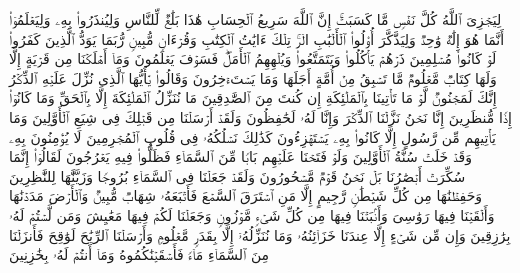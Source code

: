 \startbuffer[\q:14:51]
لِیَجۡزِیَ ٱللَّهُ كُلَّ نَفۡسࣲ مَّا كَسَبَتۡۚ إِنَّ ٱللَّهَ سَرِیعُ ٱلۡحِسَابِ%
\stopbuffer%
\startbuffer[\q:14:52]
هَٰذَا بَلَٰغࣱ لِّلنَّاسِ وَلِیُنذَرُوا۟ بِهِۦ وَلِیَعۡلَمُوۤا۟ أَنَّمَا هُوَ إِلَٰهࣱ وَٰحِدࣱ وَلِیَذَّكَّرَ أُو۟لُوا۟ ٱلۡأَلۡبَٰبِ%
\stopbuffer%
\startbuffer[\q:15:1]
الۤرۚ تِلۡكَ ءَایَٰتُ ٱلۡكِتَٰبِ وَقُرۡءَانࣲ مُّبِینࣲ%
\stopbuffer%
\startbuffer[\q:15:2]
رُّبَمَا یَوَدُّ ٱلَّذِینَ كَفَرُوا۟ لَوۡ كَانُوا۟ مُسۡلِمِینَ%
\stopbuffer%
\startbuffer[\q:15:3]
ذَرۡهُمۡ یَأۡكُلُوا۟ وَیَتَمَتَّعُوا۟ وَیُلۡهِهِمُ ٱلۡأَمَلُۖ فَسَوۡفَ یَعۡلَمُونَ%
\stopbuffer%
\startbuffer[\q:15:4]
وَمَاۤ أَهۡلَكۡنَا مِن قَرۡیَةٍ إِلَّا وَلَهَا كِتَابࣱ مَّعۡلُومࣱ%
\stopbuffer%
\startbuffer[\q:15:5]
مَّا تَسۡبِقُ مِنۡ أُمَّةٍ أَجَلَهَا وَمَا یَسۡتَءۡخِرُونَ%
\stopbuffer%
\startbuffer[\q:15:6]
وَقَالُوا۟ یَٰۤأَیُّهَا ٱلَّذِی نُزِّلَ عَلَیۡهِ ٱلذِّكۡرُ إِنَّكَ لَمَجۡنُونࣱ%
\stopbuffer%
\startbuffer[\q:15:7]
لَّوۡ مَا تَأۡتِینَا بِٱلۡمَلَٰۤئِكَةِ إِن كُنتَ مِنَ ٱلصَّٰدِقِینَ%
\stopbuffer%
\startbuffer[\q:15:8]
مَا نُنَزِّلُ ٱلۡمَلَٰۤئِكَةَ إِلَّا بِٱلۡحَقِّ وَمَا كَانُوۤا۟ إِذࣰا مُّنظَرِینَ%
\stopbuffer%
\startbuffer[\q:15:9]
إِنَّا نَحۡنُ نَزَّلۡنَا ٱلذِّكۡرَ وَإِنَّا لَهُۥ لَحَٰفِظُونَ%
\stopbuffer%
\startbuffer[\q:15:10]
وَلَقَدۡ أَرۡسَلۡنَا مِن قَبۡلِكَ فِی شِیَعِ ٱلۡأَوَّلِینَ%
\stopbuffer%
\startbuffer[\q:15:11]
وَمَا یَأۡتِیهِم مِّن رَّسُولٍ إِلَّا كَانُوا۟ بِهِۦ یَسۡتَهۡزِءُونَ%
\stopbuffer%
\startbuffer[\q:15:12]
كَذَٰلِكَ نَسۡلُكُهُۥ فِی قُلُوبِ ٱلۡمُجۡرِمِینَ%
\stopbuffer%
\startbuffer[\q:15:13]
لَا یُؤۡمِنُونَ بِهِۦ وَقَدۡ خَلَتۡ سُنَّةُ ٱلۡأَوَّلِینَ%
\stopbuffer%
\startbuffer[\q:15:14]
وَلَوۡ فَتَحۡنَا عَلَیۡهِم بَابࣰا مِّنَ ٱلسَّمَاۤءِ فَظَلُّوا۟ فِیهِ یَعۡرُجُونَ%
\stopbuffer%
\startbuffer[\q:15:15]
لَقَالُوۤا۟ إِنَّمَا سُكِّرَتۡ أَبۡصَٰرُنَا بَلۡ نَحۡنُ قَوۡمࣱ مَّسۡحُورُونَ%
\stopbuffer%
\startbuffer[\q:15:16]
وَلَقَدۡ جَعَلۡنَا فِی ٱلسَّمَاۤءِ بُرُوجࣰا وَزَیَّنَّٰهَا لِلنَّٰظِرِینَ%
\stopbuffer%
\startbuffer[\q:15:17]
وَحَفِظۡنَٰهَا مِن كُلِّ شَیۡطَٰنࣲ رَّجِیمٍ%
\stopbuffer%
\startbuffer[\q:15:18]
إِلَّا مَنِ ٱسۡتَرَقَ ٱلسَّمۡعَ فَأَتۡبَعَهُۥ شِهَابࣱ مُّبِینࣱ%
\stopbuffer%
\startbuffer[\q:15:19]
وَٱلۡأَرۡضَ مَدَدۡنَٰهَا وَأَلۡقَیۡنَا فِیهَا رَوَٰسِیَ وَأَنۢبَتۡنَا فِیهَا مِن كُلِّ شَیۡءࣲ مَّوۡزُونࣲ%
\stopbuffer%
\startbuffer[\q:15:20]
وَجَعَلۡنَا لَكُمۡ فِیهَا مَعَٰیِشَ وَمَن لَّسۡتُمۡ لَهُۥ بِرَٰزِقِینَ%
\stopbuffer%
\startbuffer[\q:15:21]
وَإِن مِّن شَیۡءٍ إِلَّا عِندَنَا خَزَاۤئِنُهُۥ وَمَا نُنَزِّلُهُۥۤ إِلَّا بِقَدَرࣲ مَّعۡلُومࣲ%
\stopbuffer%
\startbuffer[\q:15:22]
وَأَرۡسَلۡنَا ٱلرِّیَٰحَ لَوَٰقِحَ فَأَنزَلۡنَا مِنَ ٱلسَّمَاۤءِ مَاۤءࣰ فَأَسۡقَیۡنَٰكُمُوهُ وَمَاۤ أَنتُمۡ لَهُۥ بِخَٰزِنِینَ%
